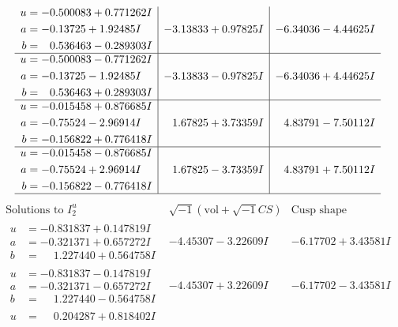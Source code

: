 \documentclass[1p]{elsarticle_modified}
\theoremstyle{definition}
\newcommand{\I}{\sqrt{-1}}
\begin{document}
$$\begin{array}{c|c|c}
\begin{aligned}
u &= -0.500083 + 0.771262 I \\
a &= -0.13725 + 1.92485 I \\
b &= \phantom{-}0.536463 - 0.289303 I\end{aligned}
 & -3.13833 + 0.97825 I & -6.34036 - 4.44625 I \\ \hline\begin{aligned}
u &= -0.500083 - 0.771262 I \\
a &= -0.13725 - 1.92485 I \\
b &= \phantom{-}0.536463 + 0.289303 I\end{aligned}
 & -3.13833 - 0.97825 I & -6.34036 + 4.44625 I \\ \hline\begin{aligned}
u &= -0.015458 + 0.876685 I \\
a &= -0.75524 - 2.96914 I \\
b &= -0.156822 + 0.776418 I\end{aligned}
 & \phantom{-}1.67825 + 3.73359 I & \phantom{-}4.83791 - 7.50112 I \\ \hline\begin{aligned}
u &= -0.015458 - 0.876685 I \\
a &= -0.75524 + 2.96914 I \\
b &= -0.156822 - 0.776418 I\end{aligned}
 & \phantom{-}1.67825 - 3.73359 I & \phantom{-}4.83791 + 7.50112 I\\
 \hline 
 \end{array}$$\newpage$$\begin{array}{c|c|c}  
\text{Solutions to }I^u_{2}& \I (\text{vol} + \sqrt{-1}CS) & \text{Cusp shape}\\
 \hline 
\begin{aligned}
u &= -0.831837 + 0.147819 I \\
a &= -0.321371 + 0.657272 I \\
b &= \phantom{-}1.227440 + 0.564758 I\end{aligned}
 & -4.45307 - 3.22609 I & -6.17702 + 3.43581 I \\ \hline\begin{aligned}
u &= -0.831837 - 0.147819 I \\
a &= -0.321371 - 0.657272 I \\
b &= \phantom{-}1.227440 - 0.564758 I\end{aligned}
 & -4.45307 + 3.22609 I & -6.17702 - 3.43581 I \\ \hline\begin{aligned}
u &= \phantom{-}0.204287 + 0.818402 I \\

\end{aligned}
\end{array}$$
\end{document}
